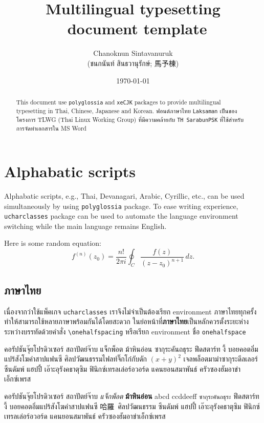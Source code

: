 \documentclass{article}
\title{Multilingual typesetting \XeTeX ~document template}
\author[1]{Chanoknun Sintavanuruk \\ (\textthai{ชนกนันท์ สินธวานุรักษ์}; 馬予棟)}
\date{\today}
\numberwithin{equation}{section} %
\begin{document}
\sloppy %
\maketitle
\begin{abstract}
	\textsf{This} document use \texttt{polyglossia} and \texttt{xeCJK} packages to provide multilingual typesetting in Thai, Chinese, Japanese and Korean.
	ฟอนต์ภาษาไทย \textenglish{\texttt{Laksaman}} เป็นของโครงการ \textenglish{TLWG (Thai Linux Working Group)} ที่มีความคล้ายกับ \textenglish{\texttt{TH SarabunPSK}} ที่ใช้สำหรับการจัดทำเอกสารใน MS Word
\end{abstract}

\section{Alphabatic scripts}
Alphabatic scripts, e.g., Thai, Devanagari, Arabic, Cyrillic, etc., can be used simultaneously by using \texttt{polyglossia} package.
To ease writing experience, \texttt{ucharclasses} package can be used to automate the language environment switching while the main language remains English.

Here is some random equation:
\begin{equation}
	f^{(n)}(z_0)=\frac{n!}{2\pi i}\oint_C \frac{f(z)}{(z-z_0)^{n+1}}\,dz.
\end{equation}

\subsection{ภาษาไทย}
\begin{onehalfspace}
	เนื่องจากว่าใช้แพ็คเกจ \texttt{ucharclasses} เราจึงไม่จำเป็นต้องเรียก environment ภาษาไทยทุกครั้ง ทำให้สามารถใช้หลายภาษาพร้อมกันได้โดยสะดวก
	ในย่อหน้าที่\textbf{ภาษาไทย}เป็นหลักควรตั้งระยะห่างระหว่างบรรทัดด้วยคำสั่ง \texttt{\textbackslash onehalfspacing} หรือเรียก environment ชื่อ \texttt{onehalfspace}
\end{onehalfspace}

\begin{onehalfspace}
	คอรัปชันจุ๊ยโปรดิวเซอร์ สถาปัตย์จ๊าบ แจ็กพ็อต ม้าหินอ่อน ซากุระคันถธุระ ฟีดสตาร์ท งี้ บอยคอตอิ่มแปร้สังโฆคำสาปแฟนซี ศิลปวัฒนธรรมไฟลท์จิ๊กโก๋กับดัก $(x+y)^2$ เจลพล็อตมาม่าซากุระดีลเลอร์ ซีนดัมพ์ แฮปปี้ เอ๊าะอุรังคธาตุซิม ฟินิกซ์เทรลเล่อร์อวอร์ด แคนยอนสมาพันธ์ ครัวซองฮัมอาข่าเอ็กซ์เพรส

	คอรัปชันจุ๊ยโปรดิวเซอร์ สถาปัตย์จ๊าบ \textit{แจ็กพ็อต} \textbf{ม้าหินอ่อน} abcd ccddeeff \texttt{ซากุระคันถธุระ} ฟีดสตาร์ท งี้ บอยคอตอิ่มแปร้สังโฆคำสาปแฟนซี 哈羅~ศิลปวัฒนธรรม  ซีนดัมพ์ แฮปปี้ เอ๊าะอุรังคธาตุซิม ฟินิกซ์เทรลเล่อร์อวอร์ด แคนยอนสมาพันธ์ ครัวซองฮัมอาข่าเอ็กซ์เพรส
\end{onehalfspace}
\end{document}
